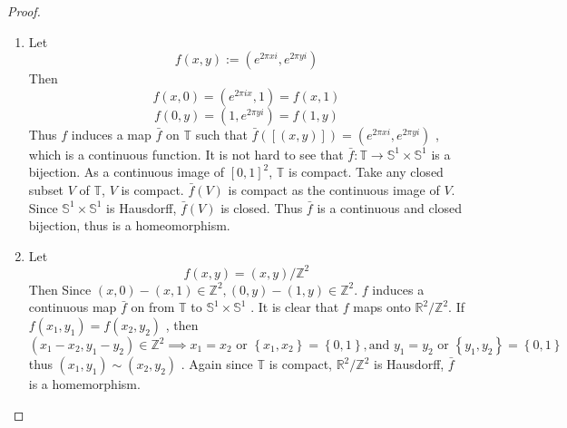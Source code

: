 \documentclass[../main.tex]{subfiles}
\begin{document}
\begin{proof}
    \begin{enumerate}
        \item Let \[
        f\left( x,y \right):=  \left( e^{2 \pi xi}, e^{2 \pi yi} \right)  
        \] Then \[
        f\left( x,0 \right)= \left( e^{2 \pi i x},1 \right)= f\left( x,1 \right)   
        \] \[
        f\left( 0,y \right)= \left( 1, e^{2 \pi yi} \right)= f\left( 1,y \right)   
        \]Thus \(  f  \) induces a map \(  \bar{f}  \) on \(  \mathbb{T}  \) such that \(  \bar{f}\left( [\left( x,y \right) ] \right)=\left( e^{2 \pi xi} , e^{2 \pi yi}\right)     \) , which is a continuous function. It is not hard to see that \(  \bar{f}: \mathbb{T}\to \mathbb{S}^{1}\times \mathbb{S}^{1}  \) is a bijection.  As a continuous image of \(  \left[ 0,1 \right]^{2}   \), \(  \mathbb{T}  \) is compact.   Take any closed subset \(  V  \) of \(  \mathbb{T}  \), \(  V  \) is compact. \(  \bar{f}\left( V \right)    \) is compact as the continuous   image of \(  V  \). Since \(  \mathbb{S}^{1}\times \mathbb{S}^{1}  \) is Hausdorff, \(  \bar{f}\left( V \right)   \) is closed.   Thus \(  \bar{f}  \) is a continuous and closed bijection, thus is a homeomorphism. 
        \item Let \[
        f\left( x,y \right)= \left( x,y \right)/ \mathbb{Z}^{2} 
        \] Then Since \(  \left( x,0 \right)-\left( x,1 \right)\in \mathbb{Z} ^{2}, \left( 0,y \right)-\left( 1,y \right)\in \mathbb{Z} ^{2}      \). \(  f  \) induces a continuous map \(  \bar{f}  \)  on from \(  \mathbb{T}  \) to \(  \mathbb{S}^{1}\times \mathbb{S}^{1}  \)   .   
        It is clear that \(  f  \) maps onto \(  \mathbb{R} ^{2}/\mathbb{Z}^{2}  \). If \(  f\left( x_1,y_1 \right)= f\left( x_2,y_2 \right)    \) , then \[
        \left( x_1-x_2,y_1-y_2 \right)\in \mathbb{Z} ^{2} \implies  x_1= x_2 \text{ or } \left\{ x_1,x_2 \right\}= \left\{ 0,1 \right\}, \text{and }y_1= y_2\text{ or } \left\{ y_1,y_2 \right\}= \left\{ 0,1 \right\}
        \]  thus \(  \left( x_1,y_1 \right)\sim \left( x_2,y_2 \right)    \) .  Again since \(  \mathbb{T}  \) is compact, \(  \mathbb{R} ^{2}/ \mathbb{Z} ^{2}  \) is Hausdorff, \(  \bar{f}  \) is a homemorphism.      
    \end{enumerate}
    
\end{proof}
\end{document}
